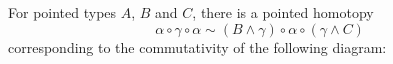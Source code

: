 \documentclass{article}
\newcommand{\smsh}{\wedge}
\renewcommand{\o}{\ensuremath{\circ}}
\begin{document}
\begin{thm}\label{thm:smash-associativity-braiding}
	For pointed types $A$, $B$ and $C$, there is a pointed homotopy
	\[\alpha \o \gamma \o \alpha \sim (B \smsh \gamma) \o \alpha \o (\gamma \smsh C)\]
	corresponding to the commutativity of the following diagram:
	\begin{center}
	\end{center}
\end{thm}
\end{document}
